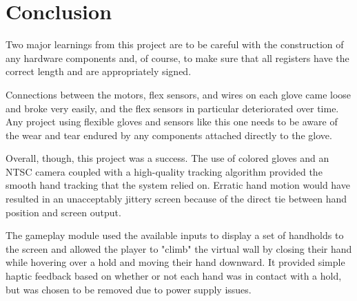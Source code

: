 \section{Conclusion}
\label{sec:conclusion}

Two major learnings from this project are to be careful with the construction of
any hardware components and, of course, to make sure that all registers have the
correct length and are appropriately signed.

Connections between the motors, flex sensors, and wires on each glove came loose
and broke very easily, and the flex sensors in particular deteriorated over
time. Any project using flexible gloves and sensors like this
one needs to be aware of the wear and tear endured by any components attached
directly to the glove.

Overall, though, this project was a success. The use of colored gloves and an
NTSC camera coupled with a high-quality tracking algorithm provided the smooth
hand tracking that the system relied on. Erratic hand motion would have resulted
in an unacceptably jittery screen because of the direct tie between hand
position and screen output.

The gameplay module used the available inputs to display a set of handholds to
the screen and allowed the player to "climb" the virtual wall by closing their
hand while hovering over a hold and moving their hand downward. It provided
simple haptic feedback based on whether or not each hand was in contact with a
hold, but was chosen to be removed due to power supply issues.

